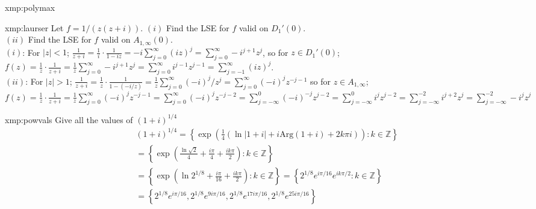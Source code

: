 \documentclass[landscape, 8pt]{extarticle}
\begin{document}
\begin{multicols*}{4}
\begin{xmp}{xmp:polymax}{ }
	\end{xmp}
	
	
	\begin{xmp-s}{xmp:laurser}{ }
		Let $f = 1/(z(z+i))$. $(i)$ Find the LSE for $f$ valid on $D_1'(0)$. \\
		$(ii)$ Find the LSE for $f$ valid on $A_{1, \infty}(0)$. \\
		$(i)$: For $\left|z\right| < 1$; $\frac{1}{z+i} = \frac{1}{i} \cdot \frac{1}{1-iz} = -i \sum_{j=0}^{\infty}(iz)^j = \sum_{j=0}^{\infty}-i^{j+1}z^j$, so for $z\in D_1'(0)$; $f(z) = \frac{1}{z} \cdot \frac{1}{z+i} = \frac{1}{z} \sum_{j=0}^{\infty}-i^{j+1} z^j = \sum_{j=0}^{\infty}i^{j-1} z^{j-1} = \sum_{j=-1}^{\infty}(iz)^j$.\\
		$(ii)$: For $\left|z\right| > 1$; $\frac{1}{z+i} = \frac{1}{z} \cdot \frac{1}{1-(-i/z)} = \frac{1}{z} \sum_{j=0}^{\infty} (-i)^j/z^j = \sum_{j=0}^{\infty}(-i)^jz^{-j-1}$ so for $z\in A_{1, \infty}$; $f(z) = \frac{1}{z} \cdot \frac{1}{z+i} = \frac{1}{z} \sum_{j=0}^{\infty}(-i)^jz^{-j-1} = \sum_{j=0}^{\infty}(-i)^j z^{-j-2} = \sum_{j=-\infty}^{0} (-i)^{-j}z^{j-2} = \sum_{j=-\infty}^{0} i^j z^{j-2} = \sum_{j=-\infty}^{-2} i^{j+2}z^j = \sum_{j=-\infty}^{-2} -i^jz^j$
		
	\end{xmp-s}
	
	
	\begin{xmp}{xmp:powvals}{ }
		Give all the values of $(1+i)^{1/4}$\\
			\begin{align*}
				&(1+i)^{1/4} =\left\{\exp\left(\frac{1}{4}(\ln\left|1+i\right| + i\text{Arg}(1+i) + 2k\pi i)\right) : k\in \mathbb{Z}\right\} \\
				&=\left\{\exp\left(\frac{\ln\sqrt{2}}{4} + \frac{i \pi}{4} + \frac{i k \pi}{2}\right) : k\in \mathbb{Z}\right\} \\
				&= \left\{\exp\left(\ln2^{1/8} + \frac{i \pi}{16} + \frac{i k \pi }{2}\right) : k\in \mathbb{Z}\right\} = \left\{2^{1/8}e^{i\pi/16}e^{i k \pi/2} : k\in \mathbb{Z}\right\} \\
				&= \left\{2^{1/8}e^{i \pi /16}, 2^{1/8}e^{9 i \pi /16}, 2^{1/8}e^{17 i \pi /16}, 2^{1/8}e^{25 i \pi/16}\right\}
			\end{align*}
		
	\end{xmp}
	
	
	
	\columnbreak
	\vspace*{-8pt}
	

\end{multicols*}
\end{document}
